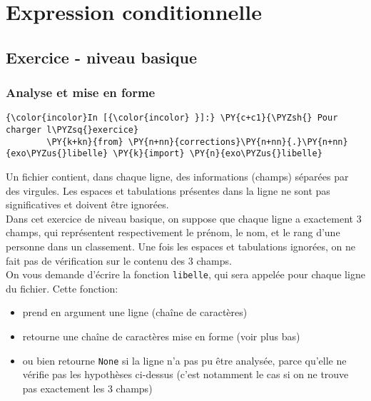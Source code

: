    \hypertarget{expression-conditionnelle}{%
\section{Expression conditionnelle}\label{expression-conditionnelle}}

    \hypertarget{exercice---niveau-basique}{%
\subsection{Exercice - niveau basique}\label{exercice---niveau-basique}}

    \hypertarget{analyse-et-mise-en-forme}{%
\subsubsection{Analyse et mise en
forme}\label{analyse-et-mise-en-forme}}

    \begin{Verbatim}[commandchars=\\\{\}]
{\color{incolor}In [{\color{incolor} }]:} \PY{c+c1}{\PYZsh{} Pour charger l\PYZsq{}exercice}
        \PY{k+kn}{from} \PY{n+nn}{corrections}\PY{n+nn}{.}\PY{n+nn}{exo\PYZus{}libelle} \PY{k}{import} \PY{n}{exo\PYZus{}libelle}
\end{Verbatim}


    Un fichier contient, dans chaque ligne, des informations (champs)
séparées par des virgules. Les espaces et tabulations présentes dans la
ligne ne sont pas significatives et doivent être ignorées.\\

Dans cet exercice de niveau basique, on suppose que chaque ligne a
exactement 3 champs, qui représentent respectivement le prénom, le nom,
et le rang d'une personne dans un classement. Une fois les espaces et
tabulations ignorées, on ne fait pas de vérification sur le contenu des
3 champs.\\

On vous demande d'écrire la fonction \texttt{libelle}, qui sera appelée
pour chaque ligne du fichier. Cette fonction:

\begin{itemize}
	\item 
	prend en argument une ligne (chaîne de caractères)
	\item
	retourne une chaîne de caractères mise en forme (voir plus bas)
	\item
	ou bien retourne \texttt{None} si la ligne n'a
	pas pu être analysée, parce qu'elle ne vérifie pas les hypothèses
	ci-dessus (c'est notamment le cas si on ne trouve pas exactement les 3
	champs)
\end{itemize}

